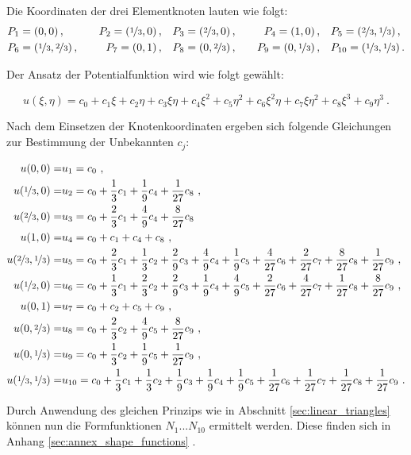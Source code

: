 Die Koordinaten der drei Elementknoten lauten wie folgt:
\begin{align}
&P_1 = \left(0, 0 \right), \quad &P_2 = \left(\nicefrac{1}{3}, 0 \right), \quad &P_3 = \left(\nicefrac{2}{3}, 0 \right), \quad &P_4 = \left(1, 0 \right), \quad &P_5 = \left(\nicefrac{2}{3}, \nicefrac{1}{3} \right),\\
&P_6 = \left(\nicefrac{1}{3}, \nicefrac{2}{3} \right), \quad &P_7 = \left(0, 1 \right), \quad &P_8 = \left(0, \nicefrac{2}{3} \right), \quad &P_9 = \left(0, \nicefrac{1}{3} \right), \quad &P_{10} = \left(\nicefrac{1}{3}, \nicefrac{1}{3} \right). \nonumber
\end{align}

Der Ansatz der Potentialfunktion wird wie folgt gewählt:

\begin{equation}
\label{eq:cubic_triangle_eq}
u(\xi, \eta) = c_0 + c_1 \xi + c_2 \eta + c_3 \xi \eta + c_4 \xi^2 + c_5 \eta^2 + c_6 \xi^2 \eta + c_7 \xi \eta^2 + c_8 \xi^3 + c_9 \eta^3\ .
\end{equation}	



Nach dem Einsetzen der Knotenkoordinaten ergeben sich folgende Gleichungen zur Bestimmung der Unbekannten $c_j$:\newline

\begin{align}
u(0,0) = &u_1 = c_0\ ,\\
u(\nicefrac{1}{3}, 0) = &u_2 = c_0 + \frac{1}{3} c_1 + \frac{1}{9} c_4 +  \frac{1}{27} c_8\ ,\nonumber \\
u(\nicefrac{2}{3}, 0) = &u_3 = c_0 + \frac{2}{3} c_1 + \frac{4}{9} c_4 +  \frac{8}{27} c_8\nonumber \\
u(1,0) = &u_4 = c_0 + c_1 + c_4 + c_8\ ,\nonumber\\
u(\nicefrac{2}{3}, \nicefrac{1}{3}) = &u_5 = c_0 + \frac{2}{3} c_1 +  \frac{1}{3} c_2 + \frac{2}{9} c_3 +  \frac{4}{9} c_4 + \frac{1}{9} c_5 + \frac{4}{27} c_6 + \frac{2}{27} c_7 + \frac{8}{27} c_8 + \frac{1}{27} c_9\ ,\nonumber\\
u(\nicefrac{1}{2}, 0) = &u_6 = c_0 + \frac{1}{3} c_1 +  \frac{2}{3} c_2 + \frac{2}{9} c_3 +  \frac{1}{9} c_4 + \frac{4}{9} c_5 + \frac{2}{27} c_6 + \frac{4}{27} c_7 + \frac{1}{27} c_8 + \frac{8}{27} c_9\ ,\nonumber\\
u(0,1) = &u_7 = c_0 + c_2 + c_5 + c_9\ ,\nonumber\\
u(0, \nicefrac{2}{3}) = &u_8 = c_0 + \frac{2}{3} c_2 + \frac{4}{9} c_5 +  \frac{8}{27} c_9\ ,\nonumber \\
u(0, \nicefrac{1}{3}) = &u_9 = c_0 + \frac{1}{3} c_2 + \frac{1}{9} c_5 +  \frac{1}{27} c_9\ ,\nonumber \\
u(\nicefrac{1}{3}, \nicefrac{1}{3}) = &u_{10} = c_0 + \frac{1}{3} c_1 +  \frac{1}{3} c_2 + \frac{1}{9} c_3 +  \frac{1}{9} c_4 + \frac{1}{9} c_5 + \frac{1}{27} c_6 + \frac{1}{27} c_7 + \frac{1}{27} c_8 + \frac{1}{27} c_9\ .\nonumber
\end{align}	
	

Durch Anwendung des gleichen Prinzips wie in Abschnitt \ref{sec:linear_triangles} können nun die Formfunktionen $N_1 \text{...} N_{10}$ ermittelt werden. Diese finden sich in Anhang \ref{sec:annex_shape_functions} .